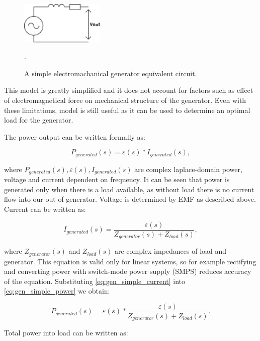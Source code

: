 \begin{figure}[htb]
\begin{center}
\includegraphics[height=2cm]{images/own_dwg/gen_simple}
\end{center}
\caption{A simple electromachanical generator equivalent circuit.}.
\label{gen_simple}
\end{figure}

This model is greatly simplified and it does not account for factors such as effect of electromagnetical force on mechanical structure of the generator. Even with these limitations, model is still useful as it can be used to determine an optimal load for the generator. 

The power output can be written formally as:

\begin{equation} \label{eq:gen_simple_power}
  P_{generated}(s) = \varepsilon(s)*I_{generated}(s),
\end{equation}

where $P_{generated}(s), \varepsilon(s), I_{generated}(s)$ are complex laplace-domain power, voltage and current dependent on frequency. It can be seen that power is generated only when there is a load available, as without load there is no current flow into our out of generator. Voltage is determined by EMF as described above. Current can be written as: 

\begin{equation} \label{eq:gen_simple_current}
  I_{generated}(s) = \frac{\varepsilon(s)}{Z_{generator}(s)+Z_{load}(s)},
\end{equation}

where $Z_{generator}(s) $ and $ Z_{load}(s)$ are complex impedances of load and generator. This equation is valid only for linear systems, so for example rectifying and converting power with switch-mode power supply (SMPS) reduces accuracy of the equation. Substituting \eqref{eq:gen_simple_current} into \eqref{eq:gen_simple_power} we obtain:

\begin{equation}
  P_{generated}(s) = \varepsilon(s)*\frac{\varepsilon(s)}{Z_{generator}(s)+Z_{load}(s)}.
\end{equation}

Total power into load can be written as:

